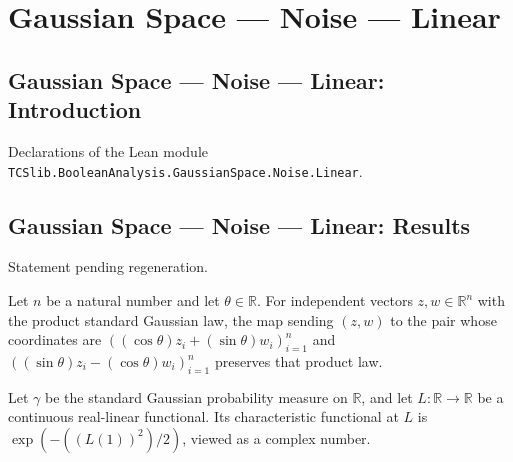\section{Gaussian Space --- Noise --- Linear}
\subsection*{Gaussian Space --- Noise --- Linear: Introduction}

Declarations of the Lean module \texttt{TCSlib.BooleanAnalysis.GaussianSpace.Noise.Linear}.

\subsection*{Gaussian Space --- Noise --- Linear: Results}

\begin{lemma}
\label{BooleanAnalysis.GaussianSpace.measurePreserving_gaussianNeg}
\leanok
{}
Statement pending regeneration.
\end{lemma}

\begin{lemma}
\label{BooleanAnalysis.GaussianSpace.measurePreserving_gaussianReflection}
\leanok
{}
Let $n$ be a natural number and let $\theta\in\mathbb R$. For independent vectors
$z,w\in\mathbb R^n$ with the product standard Gaussian law, the map sending $(z,w)$ to
the pair whose coordinates are $((\cos\theta)z_i+(\sin\theta)w_i)_{i=1}^n$ and
$((\sin\theta)z_i-(\cos\theta)w_i)_{i=1}^n$ preserves that product law.
\end{lemma}

\begin{lemma}
\label{BooleanAnalysis.GaussianSpace.charFunDual_standardGaussian}
\leanok
{}
Let $\gamma$ be the standard Gaussian probability measure on $\mathbb R$, and let
$L:\mathbb R\to\mathbb R$ be a continuous real-linear functional. Its characteristic
functional at $L$ is $\exp\!\left(-((L(1))^2)/2\right)$, viewed as a complex number.
\end{lemma}

